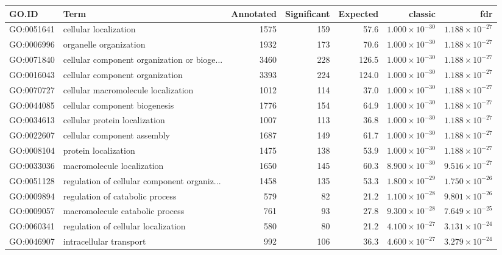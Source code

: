 \begin{table}[ht]
\centering
\begin{tabular}{llrrrrr}
  \hline
GO.ID & Term & Annotated & Significant & Expected & classic & fdr \\ 
  \hline
GO:0051641 & cellular localization & 1575 & 159 & 57.6 & $1.000 \times 10^{-30}$ & $1.188 \times 10^{-27}$ \\ 
  GO:0006996 & organelle organization & 1932 & 173 & 70.6 & $1.000 \times 10^{-30}$ & $1.188 \times 10^{-27}$ \\ 
  GO:0071840 & cellular component organization or bioge... & 3460 & 228 & 126.5 & $1.000 \times 10^{-30}$ & $1.188 \times 10^{-27}$ \\ 
  GO:0016043 & cellular component organization & 3393 & 224 & 124.0 & $1.000 \times 10^{-30}$ & $1.188 \times 10^{-27}$ \\ 
  GO:0070727 & cellular macromolecule localization & 1012 & 114 & 37.0 & $1.000 \times 10^{-30}$ & $1.188 \times 10^{-27}$ \\ 
  GO:0044085 & cellular component biogenesis & 1776 & 154 & 64.9 & $1.000 \times 10^{-30}$ & $1.188 \times 10^{-27}$ \\ 
  GO:0034613 & cellular protein localization & 1007 & 113 & 36.8 & $1.000 \times 10^{-30}$ & $1.188 \times 10^{-27}$ \\ 
  GO:0022607 & cellular component assembly & 1687 & 149 & 61.7 & $1.000 \times 10^{-30}$ & $1.188 \times 10^{-27}$ \\ 
  GO:0008104 & protein localization & 1475 & 138 & 53.9 & $1.000 \times 10^{-30}$ & $1.188 \times 10^{-27}$ \\ 
  GO:0033036 & macromolecule localization & 1650 & 145 & 60.3 & $8.900 \times 10^{-30}$ & $9.516 \times 10^{-27}$ \\ 
  GO:0051128 & regulation of cellular component organiz... & 1458 & 135 & 53.3 & $1.800 \times 10^{-29}$ & $1.750 \times 10^{-26}$ \\ 
  GO:0009894 & regulation of catabolic process & 579 & 82 & 21.2 & $1.100 \times 10^{-28}$ & $9.801 \times 10^{-26}$ \\ 
  GO:0009057 & macromolecule catabolic process & 761 & 93 & 27.8 & $9.300 \times 10^{-28}$ & $7.649 \times 10^{-25}$ \\ 
  GO:0060341 & regulation of cellular localization & 580 & 80 & 21.2 & $4.100 \times 10^{-27}$ & $3.131 \times 10^{-24}$ \\ 
  GO:0046907 & intracellular transport & 992 & 106 & 36.3 & $4.600 \times 10^{-27}$ & $3.279 \times 10^{-24}$ \\ 

\end{tabular}
\end{table}
